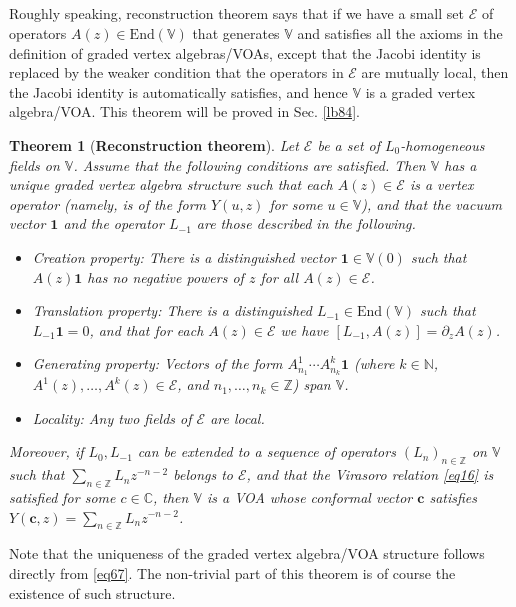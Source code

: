 \documentclass[12pt,a4paper,notitlepage]{article}
\theoremstyle{definition}
\theoremstyle{plain}
\newtheorem{thm}[df]{Theorem}
\newcommand{\mc}{\mathcal}
\newcommand{\End}{\mathrm{End}} %
\newcommand{\id}{\mathbf{1}}
\newcommand{\Vbb}{\mathbb V}
\newcommand{\Cbb}{\mathbb C}
\newcommand{\Nbb}{\mathbb N}
\newcommand{\Zbb}{\mathbb Z}
\newcommand{\cbf}{\mathbf c}
\numberwithin{equation}{section}
\begin{document}
\subsection{}




Roughly speaking, reconstruction theorem says that if we have a small set $\mc E$ of operators $A(z)\in\End(\Vbb)$ that generates $\Vbb$ and satisfies all the axioms in the definition of graded vertex algebras/VOAs, except that the Jacobi identity is replaced by the weaker condition that the operators in $\mc E$ are mutually local, then the Jacobi identity is automatically satisfies, and hence $\Vbb$ is a graded vertex algebra/VOA. This theorem will be proved in Sec. \ref{lb84}.


\begin{thm}[\textbf{Reconstruction theorem}]\label{lb39}
Let $\mc E$ be a set of $L_0$-homogeneous fields on $\Vbb$.  Assume that the following conditions are satisfied. Then $\Vbb$ has a unique graded vertex algebra structure such that each $A(z)\in\mc E$ is a vertex operator (namely, is of the form $Y(u,z)$ for some $u\in\Vbb$), and that the vacuum vector $\id$ and the operator $L_{-1}$  are those described in the following.
\begin{itemize}
\item Creation property: There is a distinguished vector $\id\in\Vbb(0)$ such that $A(z)\id$ has no negative powers of $z$ for all $A(z)\in\mc E$.
\item Translation property: There is a distinguished $L_{-1}\in\End(\Vbb)$ such that $L_{-1}\id=0$, and that for each $A(z)\in\mc E$ we have $[L_{-1},A(z)]=\partial_zA(z)$.
\item Generating property: Vectors of the form $A^1_{n_1}\cdots A^k_{n_k}\id$ (where $k\in\Nbb$, $A^1(z),\dots,A^k(z)\in\mc E$, and $n_1,\dots,n_k\in\Zbb$) span $\Vbb$. 
\item Locality: Any two fields of $\mc E$ are local.
\end{itemize}
Moreover, if $L_0,L_{-1}$ can be extended to a sequence of operators $(L_n)_{n\in\Zbb}$ on $\Vbb$ such that $\sum_{n\in\Zbb}L_nz^{-n-2}$ belongs to $\mc E$, and that the Virasoro relation \eqref{eq16} is satisfied for some $c\in\Cbb$, then $\Vbb$ is a VOA whose conformal vector $\cbf$ satisfies $Y(\cbf,z)=\sum_{n\in\Zbb}L_nz^{-n-2}$.
\end{thm}
Note that the uniqueness of the graded vertex algebra/VOA structure follows directly from \eqref{eq67}. The non-trivial part of this theorem is of course the existence of such structure.
\end{document}
